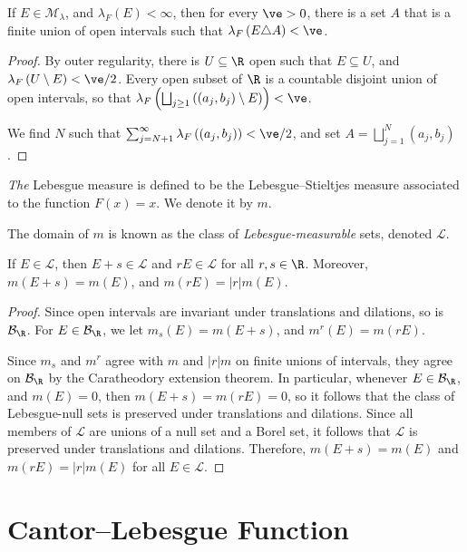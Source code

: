 \documentclass[10pt]{mypackage}
\begin{document}
\begin{proposition}
  If $E\in \mathcal{M}_{\lambda}$, and $\lambda_F\left( E  \right) < \infty$, then for every $\ve > 0$, there is a set $A$ that is a finite union of open intervals such that $\lambda_F\left( E\triangle A \right) < \ve$.
\end{proposition}
\begin{proof}
  By outer regularity, there is $U\subseteq \R$ open such that $E\subseteq U$, and $\lambda_F\left( U\setminus E \right) < \ve/2$. Every open subset of $\R$ is a countable disjoint union of open intervals, so that $\lambda_F \left( \bigsqcup_{j\geq 1}\left( \left( a_j,b_j \right)\setminus E \right) \right) < \ve$.\newline

  We find $N$ such that $\sum_{j=N+1}^{\infty}\lambda_F\left( \left( a_j,b_j \right) \right) < \ve/2$, and set $A = \bigsqcup_{j=1}^{N}\left( a_j,b_j \right)$.
\end{proof}
\begin{definition}
  \textit{The} Lebesgue measure is defined to be the Lebesgue--Stieltjes measure associated to the function $F(x) = x$. We denote it by $m$.\newline

  The domain of $m$ is known as the class of \textit{Lebesgue-measurable} sets, denoted $\mathcal{L}$.
\end{definition}
\begin{theorem}
  If $E\in \mathcal{L}$, then $E + s\in \mathcal{L}$ and $rE\in \mathcal{L}$ for all $r,s\in \R$. Moreover, $m\left( E + s \right)= m\left( E \right)$, and $m\left( rE \right) = \left\vert r \right\vert m(E)$.
\end{theorem}
\begin{proof}
  Since open intervals are invariant under translations and dilations, so is $\mathcal{B}_{\R}$. For $E\in \mathcal{B}_{\R}$, we let $m_s\left( E \right) = m\left( E + s \right)$, and $m^{r}\left( E \right) = m\left( rE \right)$.\newline

  Since $m_{s}$ and $m^{r}$ agree with $m$ and $\left\vert r \right\vert m$ on finite unions of intervals, they agree on $\mathcal{B}_{\R}$ by the Caratheodory extension theorem. In particular, whenever $E\in \mathcal{B}_{\R}$, and $m\left( E \right) = 0$, then $m\left( E + s \right) = m\left( rE \right) = 0$, so it follows that the class of Lebesgue-null sets is preserved under translations and dilations. Since all members of $\mathcal{L}$ are unions of a null set and a Borel set, it follows that $\mathcal{L}$ is preserved under translations and dilations. Therefore, $m\left( E + s \right) = m\left( E \right)$ and $m\left( rE \right) = \left\vert r \right\vert m\left( E \right)$ for all $E\in \mathcal{L}$.
\end{proof}
\section{Cantor--Lebesgue Function}%
\end{document}

